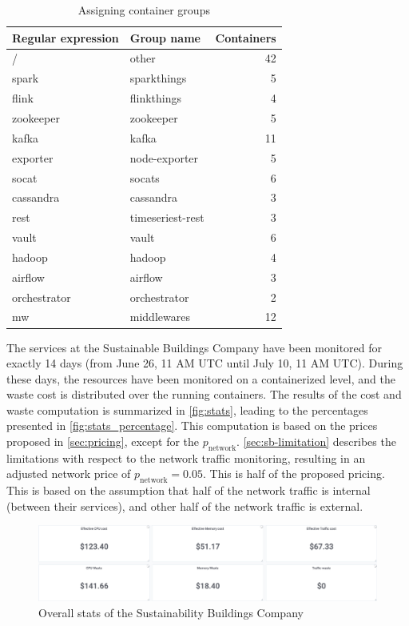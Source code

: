 \begin{table}
    \centering
    \begin{tabular}{l|lr}
        Regular expression & Group name & Containers \\ \hline
        / & other & 42 \\
        spark & sparkthings & 5\\
        flink & flinkthings & 4\\
        zookeeper & zookeeper & 5\\
        kafka & kafka & 11\\
        exporter & node-exporter & 5\\
        socat & socats & 6\\
        cassandra & cassandra & 3\\
        rest & timeseriest-rest & 3\\
        vault & vault & 6\\
        hadoop & hadoop & 4\\
        airflow & airflow & 3\\
        orchestrator & orchestrator & 2\\
        mw & middlewares & 12\\
    \end{tabular}
    \caption{Assigning container groups}
    \label{tab:regex}
\end{table}

\noindent
The services at the Sustainable Buildings Company have been monitored for exactly 14 days (from June 26, 11 AM UTC until July 10, 11 AM UTC). During these days, the resources have been monitored on a containerized level, and the waste cost is distributed over the running containers. The results of the cost and waste computation is summarized in \autoref{fig:stats}, leading to the percentages presented in \autoref{fig:stats_percentage}. This computation is based on the prices proposed in \autoref{sec:pricing}, except for the $p_\text{network}$. \autoref{sec:sb-limitation} describes the limitations with respect to the network traffic monitoring, resulting in an adjusted network price of $p_\text{network} = 0.05$. This is half of the proposed pricing. This is based on the assumption that half of the network traffic is internal (between their services), and other half of the network traffic is external.\\

\begin{figure}
    \centering
    \includegraphics[width=\textwidth]{gfx/stats.png}
    \caption{Overall stats of the Sustainability Buildings Company}
    \label{fig:stats}
\end{figure}


